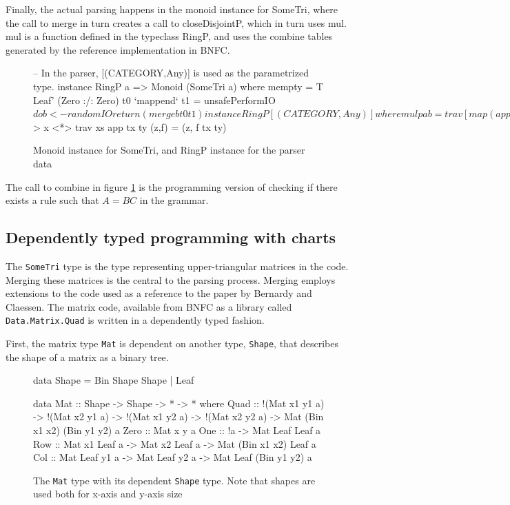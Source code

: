 \documentclass[a4paper,12pt,twosided]{report}
\begin{document}
Finally, the actual parsing happens in the monoid instance for SomeTri, where
the call to merge in turn creates a call to closeDisjointP, which in turn uses
mul. mul is a function defined in the typeclass RingP, and uses the combine
tables generated by the reference implementation in BNFC.

\begin{figure}[H]
\begin{code}
-- In the parser, [(CATEGORY,Any)] is used as the parametrized type.
instance RingP a => Monoid (SomeTri a) where
    mempty = T Leaf' (Zero :/: Zero)
    t0 `mappend` t1 = unsafePerformIO $ do
      b <- randomIO
      return (merge b t0 t1)

instance RingP [(CATEGORY,Any)] where
  mul p a b = trav [map (app tx ty) l :/: map (app tx ty) r 
                   | (x,tx) <- a, (y,ty) <- b
                   , let l:/:r = combine p x y]
    where trav :: [Pair [a]] -> Pair [a]
          trav [] = pure []
          trav (x:xs) = (++) <$> x <*> trav xs
          app tx ty (z,f)  = (z, f tx ty)
\end{code}
\caption{\label{parsemonoid}Monoid instance for SomeTri, and RingP instance for
the parser data}
\end{figure}
The call to combine in figure \ref{parsemonoid} is the programming version of
checking if there exists a rule such that $A = BC$ in the grammar.

\subsection{Dependently typed programming with charts}
The \texttt{SomeTri} type is the type representing upper-triangular matrices in
the code. Merging these matrices is the central to the parsing process. Merging
employs extensions to the code used as a reference to the paper by Bernardy and
Claessen. The matrix code, available from BNFC as a library called
\texttt{Data.Matrix.Quad} is written in a dependently typed fashion.

First, the matrix type \texttt{Mat} is dependent on another type,
\texttt{Shape}, that describes the shape of a matrix as a binary tree.

\begin{figure}[H]
\begin{code}
data Shape = Bin Shape Shape | Leaf

data Mat :: Shape -> Shape -> * -> * where
  Quad :: !(Mat x1 y1 a) -> !(Mat x2 y1 a) ->
          !(Mat x1 y2 a) -> !(Mat x2 y2 a) ->
          Mat (Bin x1 x2) (Bin y1 y2) a
  Zero :: Mat x y a
  One :: !a -> Mat Leaf Leaf a
  Row :: Mat x1 Leaf a -> Mat x2 Leaf a -> Mat (Bin x1 x2) Leaf a
  Col :: Mat Leaf y1 a -> Mat Leaf y2 a -> Mat Leaf (Bin y1 y2) a
\end{code}
\caption{The \texttt{Mat} type with its dependent \texttt{Shape} type. Note that
shapes are used both for x-axis and y-axis size}
\end{figure}
\end{document}
